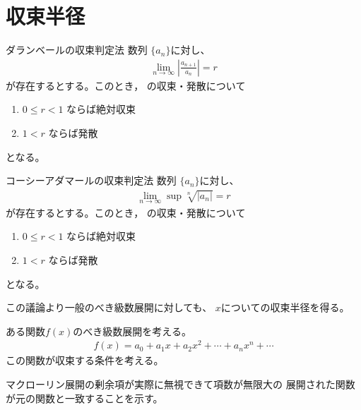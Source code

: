 \newpage
\section{収束半径}
\begin{itembox}[l]{ダランベールの収束判定法}
  数列 $\{a_{n}\}$に対し、
  \begin{gather}
    \lim_{n\to\infty}\left|\frac{a_{n+1}}{a_n}\right| = r
  \end{gather}
  が存在するとする。このとき，
  の収束・発散について
  \begin{enumerate}[label=\cdot]
    \item $0\leq r<1$ ならば絶対収束
    \item $1<r$ ならば発散
  \end{enumerate}
  となる。
\end{itembox}

\begin{itembox}[l]{コーシーアダマールの収束判定法}
  数列 $\{a_{n}\}$に対し、
  \begin{gather}
    \lim_{n\to\infty}\sup \sqrt[n]{|a_{n}|} = r
  \end{gather}
  が存在するとする。このとき，
  の収束・発散について
  \begin{enumerate}[label=\cdot]
    \item $0\leq r<1$ ならば絶対収束
    \item $1<r$ ならば発散
  \end{enumerate}
  となる。
\end{itembox}



この議論より一般のべき級数展開に対しても、
$x$についての収束半径を得る。

ある関数$f(x)$のべき級数展開を考える。
\begin{gather}
  f(x) = a_0 + a_1 x + a_2 x^2 + \cdots + a_n x^n + \cdots
\end{gather}
この関数が収束する条件を考える。

マクローリン展開の剰余項が実際に無視できて項数が無限大の
展開された関数が元の関数と一致することを示す。
